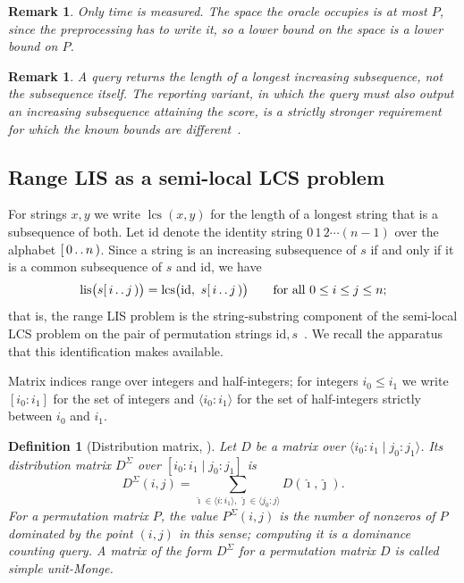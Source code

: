 \documentclass[10pt]{article}
\newtheorem{definition}{Definition}
\newtheorem{remark}[theorem]{Remark}
\newcommand{\lcs}{\operatorname{lcs}}
\newcommand{\lis}{\operatorname{lis}}
\newcommand{\id}{\mathrm{id}}
\begin{document}
\begin{remark}\label{rem:timeonly}
Only time is measured. The space the oracle occupies is at most $P$, since the
preprocessing has to write it, so a lower bound on the space is a lower bound
on $P$.
\end{remark}

\begin{remark}\label{rem:report}
A query returns the \emph{length} of a longest increasing subsequence, not the
subsequence itself. The reporting variant, in which the query must also output
an increasing subsequence attaining the score, is a strictly stronger
requirement for which the known bounds are different~\cite[Theorem 1.3]{GGK25}.
\end{remark}

\subsection{Range LIS as a semi-local LCS problem}\label{sec:seaweed}

For strings $x,y$ we write $\lcs(x,y)$ for the length of a longest string that
is a subsequence of both. Let $\id$ denote the identity string
$0\,1\,2\cdots(n-1)$ over the alphabet $[\,0\mathinner{.\,.}n\,)$. Since a string is an
increasing subsequence of $s$ if and only if it is a common subsequence of $s$
and $\id$, we have
\begin{equation}\label{eq:lislcs}
\lis\bigl(s[\,i\mathinner{.\,.}j\,)\bigr)=\lcs\bigl(\id,\ s[\,i\mathinner{.\,.}j\,)\bigr)
\qquad\text{for all }0\le i\le j\le n;
\end{equation}
that is, the range LIS problem is the string-substring component of the
semi-local LCS problem on the pair of permutation strings
$\id,s$~\cite[Section 8.1]{TiskinArXiv}. We recall the apparatus that this
identification makes available.

Matrix indices range over integers and half-integers; for integers
$i_0\le i_1$ we write $[i_0:i_1]$ for the set of integers and
$\langle i_0:i_1\rangle$ for the set of half-integers strictly between $i_0$
and $i_1$.

\begin{definition}[Distribution matrix, {\cite[Definition 2.1]{TiskinArXiv}}]\label{def:dist}
Let $D$ be a matrix over $\langle i_0:i_1\mid j_0:j_1\rangle$. Its
\emph{distribution matrix} $D^{\Sigma}$ over $[i_0:i_1\mid j_0:j_1]$ is
\[
D^{\Sigma}(i,j)=\sum_{\hat\imath\in\langle i:i_1\rangle,\ \hat\jmath\in\langle j_0:j\rangle}D(\hat\imath,\hat\jmath).
\]
For a permutation matrix $P$, the value $P^{\Sigma}(i,j)$ is the number of
nonzeros of $P$ dominated by the point $(i,j)$ in this sense; computing it is a
\emph{dominance counting} query. A matrix of the form $D^\Sigma$ for a
permutation matrix $D$ is called \emph{simple unit-Monge}.
\end{definition}
\end{document}
